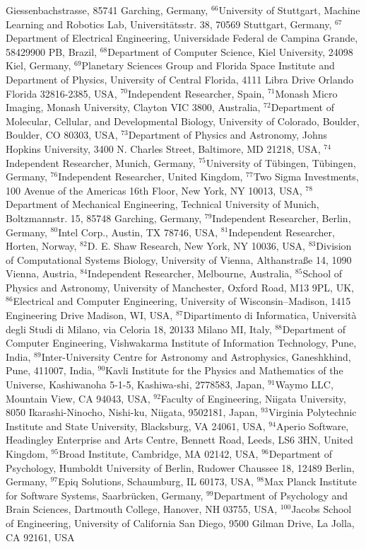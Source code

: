 Giessenbachstrasse, 85741 Garching, Germany, $^{66}$University of Stuttgart, Machine Learning and Robotics Lab, Universitätsstr. 38, 70569 Stuttgart, Germany, $^{67}$Department of Electrical Engineering, Universidade Federal de Campina Grande, 58429900 PB, Brazil, $^{68}$Department of Computer Science, Kiel University, 24098 Kiel, Germany, $^{69}$Planetary Sciences Group and Florida Space Institute and Department of Physics, University of Central Florida, 4111 Libra Drive Orlando Florida 32816-2385, USA, $^{70}$Independent Researcher, Spain, $^{71}$Monash Micro Imaging, Monash University, Clayton VIC 3800, Australia, $^{72}$Department of Molecular, Cellular, and Developmental Biology, University of Colorado, Boulder, Boulder, CO 80303, USA, $^{73}$Department of Physics and Astronomy, Johns Hopkins University, 3400 N. Charles Street, Baltimore, MD 21218, USA, $^{74}$Independent Researcher, Munich, Germany, $^{75}$University of T\"ubingen, T\"ubingen, Germany, $^{76}$Independent Researcher, United Kingdom, $^{77}$Two Sigma Investments, 100 Avenue of the Americas 16th Floor, New York, NY 10013, USA, $^{78}$Department of Mechanical Engineering, Technical University of Munich, Boltzmannstr. 15, 85748 Garching, Germany, $^{79}$Independent Researcher, Berlin, Germany, $^{80}$Intel Corp., Austin, TX 78746, USA, $^{81}$Independent Researcher, Horten, Norway, $^{82}$D. E. Shaw Research, New York, NY 10036, USA, $^{83}$Division of Computational Systems Biology, University of Vienna, Althanstra{\ss}e 14, 1090 Vienna, Austria, $^{84}$Independent Researcher, Melbourne, Australia, $^{85}$School of Physics and Astronomy, University of Manchester, Oxford Road, M13 9PL, UK, $^{86}$Electrical and Computer Engineering, University of Wisconsin--Madison, 1415 Engineering Drive Madison, WI, USA, $^{87}$Dipartimento di Informatica, Universit\`a degli Studi di Milano, via Celoria 18, 20133 Milano MI, Italy, $^{88}$Department of Computer Engineering, Vishwakarma Institute of Information Technology, Pune, India, $^{89}$Inter-University Centre for Astronomy and Astrophysics, Ganeshkhind, Pune, 411007, India, $^{90}$Kavli Institute for the Physics and Mathematics of the Universe, Kashiwanoha 5-1-5, Kashiwa-shi, 2778583, Japan, $^{91}$Waymo LLC, Mountain View, CA 94043, USA, $^{92}$Faculty of Engineering, Niigata University, 8050 Ikarashi-Ninocho, Nishi-ku, Niigata, 9502181, Japan, $^{93}$Virginia Polytechnic Institute and State University, Blacksburg, VA 24061, USA, $^{94}$Aperio Software, Headingley Enterprise and Arts Centre, Bennett Road, Leeds, LS6 3HN, United Kingdom, $^{95}$Broad Institute, Cambridge, MA 02142, USA, $^{96}$Department of Psychology, Humboldt University of Berlin, Rudower Chaussee 18, 12489 Berlin, Germany, $^{97}$Epiq Solutions, Schaumburg, IL 60173, USA, $^{98}$Max Planck Institute for Software Systems, Saarbr\"ucken, Germany, $^{99}$Department of Psychology and Brain Sciences, Dartmouth College, Hanover, NH 03755, USA, $^{100}$Jacobs School of Engineering, University of California San Diego, 9500 Gilman Drive, La Jolla, CA 92161, USA